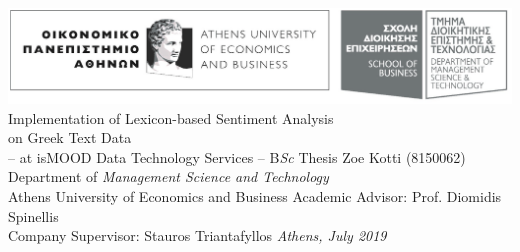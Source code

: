 \documentclass[dvips, letterpaper, 12pt]{report}
\begin{document}
\sloppy


\thesistitle
    {\includegraphics[width=\textwidth]{aueb_logo.eps}}
	{Implementation of Lexicon-based Sentiment Analysis \\
	\vspace{3mm}
	 on Greek Text Data \\
	\vspace{1cm}
	 -- at isMOOD Data Technology Services --}
    {B\emph{Sc} Thesis}
	{Zoe Kotti}
	{(8150062)}
	{Department of \emph{Management Science and Technology} \\
     Athens University of Economics and Business}
	{Academic Advisor: Prof. Diomidis Spinellis \\
     Company Supervisor: Stauros Triantafyllos}
    {\emph{Athens, July 2019}}




\tableofcontents






% 











\appendix

\end{document}
